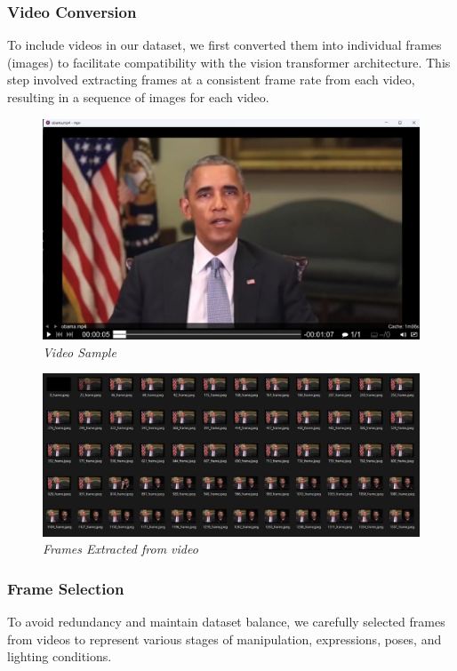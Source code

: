 \subsubsection{Video Conversion}
To include videos in our dataset, we first converted them into individual frames (images) to facilitate compatibility with the vision transformer architecture. This step involved extracting frames at a consistent frame rate from each video, resulting in a sequence of images for each video.
\begin{figure}[htbp]
    \centering
    \includegraphics[width= 5in ]{img/framesExtracted.jpg}
    \caption{\textit{Video Sample}}
\end{figure}
\begin{figure}[ht]
    \centering
    \includegraphics[width= 5in ]{img/frames.jpg}
    \caption{\textit{Frames Extracted from video}}
\end{figure}

\subsubsection{Frame Selection}
To avoid redundancy and maintain dataset balance, we carefully selected frames from videos to represent various stages of manipulation, expressions, poses, and lighting conditions.


